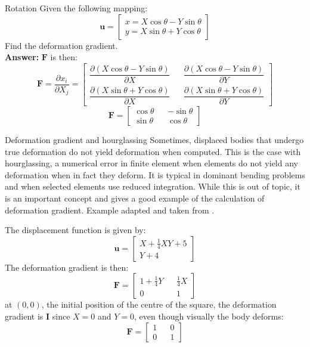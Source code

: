 \begin{example}{Rotation}
    Given the following mapping:
$$ 
    \mathbf{u} = \begin{bmatrix}
        x = X \cos \theta - Y \sin \theta \\
        y = X \sin \theta + Y \cos \theta
    \end{bmatrix}
$$
Find the deformation gradient.\\
\textbf{Answer: }
$\mathbf{F}$ is then:
$$
    \mathbf{F}=\dfrac{\partial x_i}{\partial X_j}=\begin{bmatrix}
        \dfrac{\partial (X \cos \theta - Y \sin \theta)}{\partial X} && \dfrac{\partial (X \cos \theta - Y \sin \theta)}{\partial Y}\\
        \dfrac{\partial (X \sin \theta + Y \cos \theta)}{\partial X} && \dfrac{\partial (X \sin \theta + Y \cos \theta)}{\partial Y}
    \end{bmatrix}
$$ 
$$
    \mathbf{F}=
    \begin{bmatrix}
        \cos \theta && -\sin \theta \\
        \sin \theta && \cos \theta
    \end{bmatrix}
$$
\end{example}
\begin{keyconcept}{Deformation gradient and hourglassing}
    Sometimes, displaced bodies that undergo true deformation do not yield deformation when computed. This is the case with hourglassing, a numerical error in finite element when elements do not yield any deformation when in fact they deform. It is typical in dominant bending problems and when selected elements use reduced integration. While this is out of topic, it is an important concept and gives a good example of the calculation of deformation gradient. Example adapted and taken from \cite{McGinty}.

    The displacement function is given by:
    $$
        \mathbf{u} = \begin{bmatrix}
            X + \tfrac{1}{4}XY + 5 \\
            Y + 4
        \end{bmatrix}
    $$
    The deformation gradient is then:
    $$
        \mathbf{F} = \begin{bmatrix}
            1+\tfrac{1}{4}Y && \tfrac{1}{4}X \\
            0 && 1
        \end{bmatrix}
    $$
    at $(0,0)$, the initial position of the centre of the square, the deformation gradient is $\mathbf{I}$ since $X=0$ and $Y=0$, even though visually the body deforms:
    $$
        \mathbf{F} = \begin{bmatrix}
            1 && 0 \\
            0 && 1
        \end{bmatrix}
    $$
    
    
\end{keyconcept}

